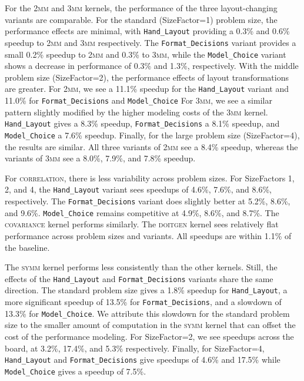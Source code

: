 For the \textsc{2mm} and \textsc{3mm} kernels, the performance of the three layout-changing variants are comparable. 
For the standard (SizeFactor=1) problem size, the performance effects are minimal, with \verb.Hand_Layout. providing a 0.3\% and 0.6\% speedup to \textsc{2mm} and \textsc{3mm} respectively. 
The \verb.Format_Decisions. variant provides a small 0.2\% speedup to \textsc{2mm} and 0.3\% to \textsc{3mm}, while the \verb.Model_Choice. variant shows a decrease in performance of 0.3\% and 1.3\%, respectively. 
With the middle problem size (SizeFactor=2), the performance effects of layout transformations are greater. 
For \textsc{2mm}, we see a 11.1\% speedup for the \verb.Hand_Layout. variant and 11.0\% for \verb.Format_Decisions. and \verb.Model_Choice. 
For \textsc{3mm}, we see a similar pattern slightly modified by the higher modeling costs of the \textsc{3mm} kernel. \verb.Hand_Layout. gives a 8.3\% speedup, \verb.Format_Decisions. a 8.1\% speedup, and \verb.Model_Choice. a 7.6\% speedup.
Finally, for the large problem size (SizeFactor=4), the results are similar.
All three variants of \textsc{2mm} see a 8.4\% speedup, whereas the variants of \textsc{3mm} see a 8.0\%, 7.9\%, and 7.8\% speedup.

For \textsc{correlation}, there is less variability across problem sizes. 
For SizeFactors 1, 2, and 4, the \verb.Hand_Layout. variant sees speedups of 4.6\%, 7.6\%, and 8.6\%, respectively. 
The \verb.Format_Decisions. variant does slightly better at 5.2\%, 8.6\%, and 9.6\%.
\verb.Model_Choice. remains competitive at 4.9\%, 8.6\%, and 8.7\%.
The \textsc{covariance} kernel performs similarly.
The \textsc{doitgen} kernel sees relatively flat performance across problem sizes and variants. All speedups are within 1.1\% of the baseline.

The \textsc{symm} kernel performs less consistently than the other kernels.
Still, the effects of the \verb.Hand_Layout. and \verb.Format_Decisions. variants share the same direction.
The standard problem size gives a 1.8\% speedup for \verb.Hand_Layout., a more significant speedup of 13.5\% for \verb.Format_Decisions., and a slowdown of 13.3\% for \verb.Model_Choice.. 
We attribute this slowdown for the standard problem size to the smaller amount of computation in the \textsc{symm} kernel that can offset the cost of the performance modeling. 
For SizeFactor=2, we see speedups across the board, at 3.2\%, 17.4\%, and 5.3\% respectively.
Finally, for SizeFactor=4, \verb.Hand_Layout. and \verb.Format_Decisions. give speedups of 4.6\% and 17.5\% while \verb.Model_Choice. gives a speedup of 7.5\%.


